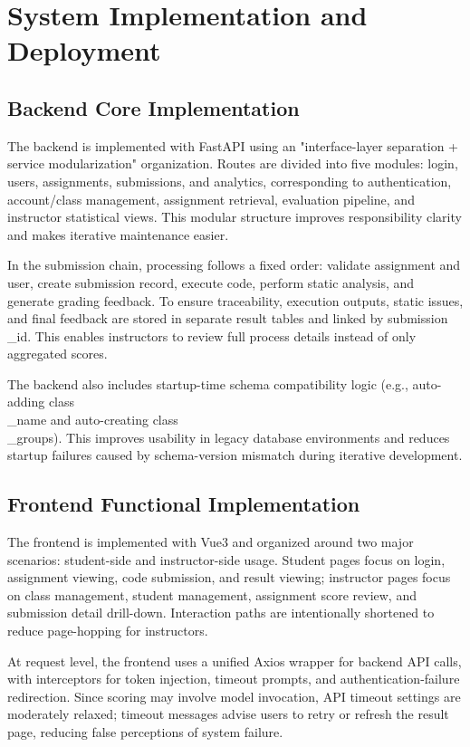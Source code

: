 ﻿\chapter{System Implementation and Deployment}


\section{Backend Core Implementation}

The backend is implemented with FastAPI using an "interface-layer separation + service modularization" organization. Routes are divided into five modules: login, users, assignments, submissions, and analytics, corresponding to authentication, account/class management, assignment retrieval, evaluation pipeline, and instructor statistical views. This modular structure improves responsibility clarity and makes iterative maintenance easier.

In the submission chain, processing follows a fixed order: validate assignment and user, create submission record, execute code, perform static analysis, and generate grading feedback. To ensure traceability, execution outputs, static issues, and final feedback are stored in separate result tables and linked by submission\\_id. This enables instructors to review full process details instead of only aggregated scores.

The backend also includes startup-time schema compatibility logic (e.g., auto-adding class\\_name and auto-creating class\\_groups). This improves usability in legacy database environments and reduces startup failures caused by schema-version mismatch during iterative development.

\section{Frontend Functional Implementation}

The frontend is implemented with Vue3 and organized around two major scenarios: student-side and instructor-side usage. Student pages focus on login, assignment viewing, code submission, and result viewing; instructor pages focus on class management, student management, assignment score review, and submission detail drill-down. Interaction paths are intentionally shortened to reduce page-hopping for instructors.

At request level, the frontend uses a unified Axios wrapper for backend API calls, with interceptors for token injection, timeout prompts, and authentication-failure redirection. Since scoring may involve model invocation, API timeout settings are moderately relaxed; timeout messages advise users to retry or refresh the result page, reducing false perceptions of system failure.

